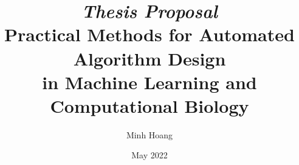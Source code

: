 \documentclass[11pt]{cmuthesis}
\begin{document}
 
\frontmatter

\pagestyle{empty}

\title{ {\it \huge Thesis Proposal}\\
{\bf Practical Methods for Automated Algorithm Design \\ in Machine Learning and Computational Biology}}
\author{Minh Hoang}
\date{May 2022}
\trnumber{}




\maketitle


\pagestyle{plain} %

\begin{abstract}

\end{abstract}
% 



\tableofcontents
\listoffigures
\listoftables

\mainmatter

\renewcommand{\baselinestretch}{1.66}\normalsize

%
%
%
%
%
\end{document}
